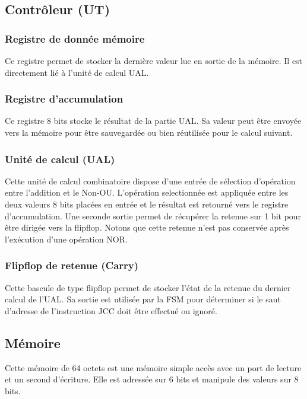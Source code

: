 \documentclass{article}
\begin{document}
    \subsection{Contrôleur (UT)}
    \subsubsection{Registre de donnée mémoire}
    \par Ce registre permet de stocker la dernière valeur lue en sortie de la mémoire. Il est directement lié à l'unité de calcul UAL.
    \subsubsection{Registre d'accumulation}
    \par Ce registre 8 bits stocke le résultat de la partie UAL. Sa valeur peut être envoyée vers la mémoire pour être sauvegardée ou bien réutilisée pour le calcul suivant.
    \subsubsection{Unité de calcul (UAL)}
    \par Cette unité de calcul combinatoire dispose d'une entrée de sélection d'opération entre l'addition et le Non-OU. L'opération selectionnée est appliquée entre les deux valeurs 8 bits placées en entrée et le résultat est retourné vers le registre d'accumulation. Une seconde sortie permet de récupérer la retenue sur 1 bit pour être dirigée vers la flipflop. Notons que cette retenue n'est pas conservée après l'exécution d'une opération NOR.
    \subsubsection{Flipflop de retenue (Carry)}
    \par Cette bascule de type flipflop permet de stocker l'état de la retenue du dernier calcul de l'UAL. Sa sortie est utilisée par la FSM pour déterminer si le saut d'adresse de l'instruction JCC doit être effectué ou ignoré.
    \subsection{Mémoire}
    \par Cette mémoire de 64 octets est une mémoire simple accès avec un port de lecture et un second d'écriture. Elle est adressée sur 6 bits et manipule des valeurs sur 8 bits.
\end{document}
